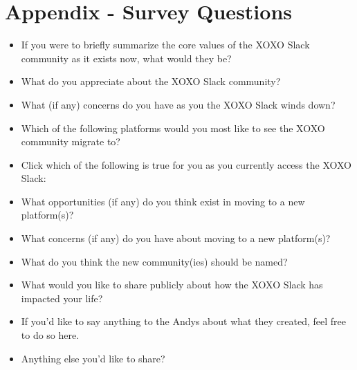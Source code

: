 \documentclass[
]{book}
\providecommand{\tightlist}{%
  \setlength{\itemsep}{0pt}\setlength{\parskip}{0pt}}
\begin{document}
\chapter{Appendix - Survey Questions}\label{appendix---survey-questions}

\begin{itemize}
\tightlist
\item
  If you were to briefly summarize the core values of the XOXO Slack community as it exists now, what would they be?
\item
  What do you appreciate about the XOXO Slack community?
\item
  What (if any) concerns do you have as you the XOXO Slack winds down?
\item
  Which of the following platforms would you most like to see the XOXO community migrate to?
\item
  Click which of the following is true for you as you currently access the XOXO Slack:
\item
  What opportunities (if any) do you think exist in moving to a new platform(s)?
\item
  What concerns (if any) do you have about moving to a new platform(s)?
\item
  What do you think the new community(ies) should be named?
\item
  What would you like to share publicly about how the XOXO Slack has impacted your life?
\item
  If you'd like to say anything to the Andys about what they created, feel free to do so here.
\item
  Anything else you'd like to share?
\end{itemize}

  
\end{document}

